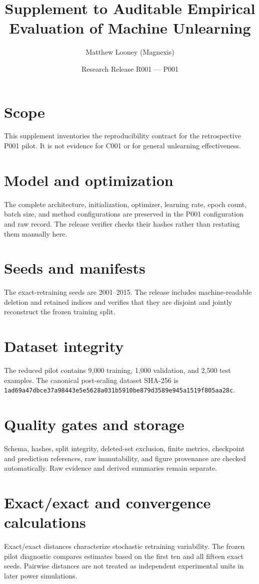 \documentclass[10pt]{article}
\title{Supplement to Auditable Empirical Evaluation of Machine Unlearning}
\author{Matthew Looney (Magnexis)}
\date{Research Release R001 --- P001}
\begin{document}
\maketitle
\section{Scope}
This supplement inventories the reproducibility contract for the retrospective P001 pilot.
It is not evidence for C001 or for general unlearning effectiveness.
\section{Model and optimization}
The complete architecture, initialization, optimizer, learning rate, epoch count, batch
size, and method configurations are preserved in the P001 configuration and raw record.
The release verifier checks their hashes rather than restating them manually here.
\section{Seeds and manifests}
The exact-retraining seeds are 2001--2015. The release includes machine-readable deletion
and retained indices and verifies that they are disjoint and jointly reconstruct the frozen
training split.
\section{Dataset integrity}
The reduced pilot contains 9,000 training, 1,000 validation, and 2,500 test examples. The
canonical post-scaling dataset SHA-256 is
\texttt{1ad69a47dbce37a98443e5e5628a031b5910be879d3589e945a1519f805aa28c}.
\section{Quality gates and storage}
Schema, hashes, split integrity, deleted-set exclusion, finite metrics, checkpoint and
prediction references, raw immutability, and figure provenance are checked automatically.
Raw evidence and derived summaries remain separate.
\section{Exact/exact and convergence calculations}
Exact/exact distances characterize stochastic retraining variability. The frozen pilot
diagnostic compares estimates based on the first ten and all fifteen exact seeds. Pairwise
distances are not treated as independent experimental units in later power simulations.
\end{document}
